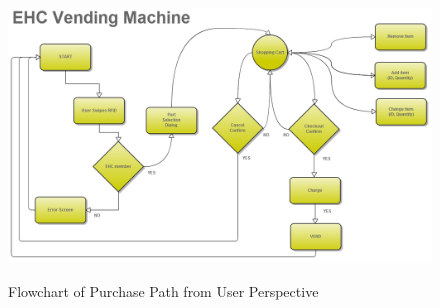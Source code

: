 \documentclass[12pt,oneside,final]{article}
\begin{document}
\begin{figure}[H]%
  \includegraphics[width=6.5in]{2012-11-11_flowchart-of-purchase-path.png}%
  \label{fig:purchase-path}%
  \caption{Flowchart of Purchase Path from User Perspective}%
\end{figure}
\end{document}
